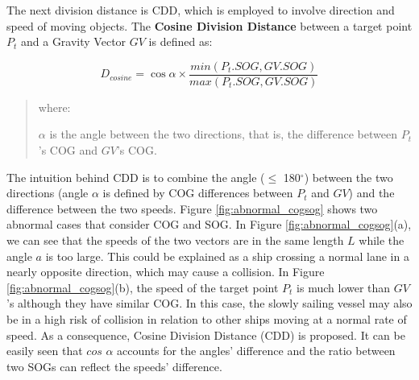 \documentclass[12pt,glossary]{dalcsthesis}
\begin{document}
The next division distance is CDD, which is employed to involve direction and speed of moving objects. The \textbf{Cosine Division Distance} between a target point $P_t$ and a Gravity Vector $GV$ is defined as:

\begin{equation}
\label{eq:cdd}
D_{cosine} = \cos\alpha\times\frac{min(P_t.SOG,GV.SOG)}{max(P_t.SOG,GV.SOG)}
\end{equation}
\begin{quote}
where:

 $\alpha$ is the angle between the two directions, that is, the difference between $P_t$'s COG and $GV$'s COG. \\
\end{quote}






The intuition behind CDD is to combine the angle ($\leq$ 180$^\circ$) between the two directions (angle $\alpha$ is defined by COG differences between $P_t$ and $GV$) and the difference between the two speeds. Figure \ref{fig:abnormal_cogsog} shows two abnormal cases that consider COG and SOG. In Figure \ref{fig:abnormal_cogsog}(a), we can see that the speeds of the two vectors are in the same length $L$ while the angle $a$ is too large. This could be explained as a ship crossing a normal lane in a nearly opposite direction, which may cause a collision. In Figure \ref{fig:abnormal_cogsog}(b), the speed of the target point $P_t$ is much lower than $GV$'s although they have similar COG. In this case, the slowly sailing vessel may also be in a high risk of collision in relation to other ships moving at a normal rate of speed. As a consequence, Cosine Division Distance (CDD) is proposed. It can be easily seen that $cos$ $\alpha$ accounts for the angles' difference and the ratio between two SOGs can reflect the speeds' difference. 
\end{document}
